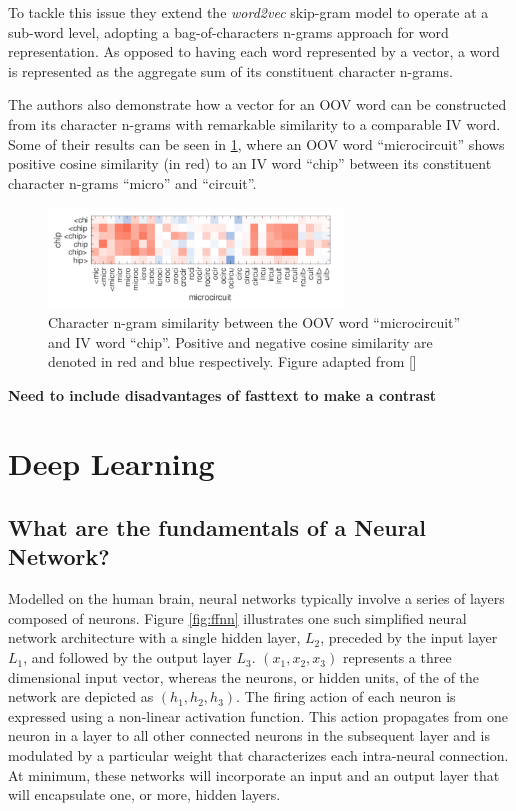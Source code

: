 \documentclass[12pt, a4paper]{report}
\theoremstyle{definition}
\theoremstyle{definition}%
\theoremstyle{definition}%
\theoremstyle{definition}%
\theoremstyle{definition}%
\theoremstyle{definition}%
\renewcommand{\cite}[1]{[\citealp{#1}]}
\begin{document}
To tackle this issue they extend the \textit{word2vec} skip-gram model to operate at a sub-word level, adopting a bag-of-characters n-grams approach for word representation. As opposed to having each word represented by a vector, a word is represented as the aggregate sum of its constituent character n-grams. 

The authors also demonstrate how a vector for an OOV word can be constructed from its character n-grams with remarkable similarity to a comparable IV word. Some of their results can be seen in \ref{fig:fasttext_oov_similarity}, where an OOV word \enquote{microcircuit} shows positive cosine similarity (in red) to an IV word \enquote{chip} between its constituent character n-grams \enquote{micro} and \enquote{circuit}.

\begin{figure}[!ht]
    \centering
    \includegraphics[width=0.7\textwidth]{fyp_template/figures/fasttext_oov_similarity.png}
    \caption{Character n-gram similarity between the OOV word \enquote{microcircuit} and IV word \enquote{chip}. Positive and negative cosine similarity are denoted in red and blue respectively. Figure adapted from \cite{bojanowski2017}}
    \label{fig:fasttext_oov_similarity}
\end{figure}

\textbf{Need to include disadvantages of fasttext to make a contrast}

\section{Deep Learning}
\subsection{What are the fundamentals of a Neural Network?}
Modelled on the human brain, neural networks typically involve a series of layers composed of neurons. Figure \ref{fig:ffnn} illustrates one such simplified neural network architecture with a single hidden layer, $L_2$, preceded by the input layer $L_1$, and followed by the output layer $L_3$. $(x_1, x_2, x_3)$ represents a three dimensional input vector, whereas the neurons, or hidden units, of the of the network are depicted as $(h_1, h_2, h_3)$. The firing action of each neuron is expressed using a non-linear activation function. This action propagates from one neuron in a layer to all other connected neurons in the subsequent layer and is modulated by a particular weight that characterizes each intra-neural connection. At minimum, these networks will incorporate an input and an output layer that will encapsulate one, or more, hidden layers. 
\end{document}
